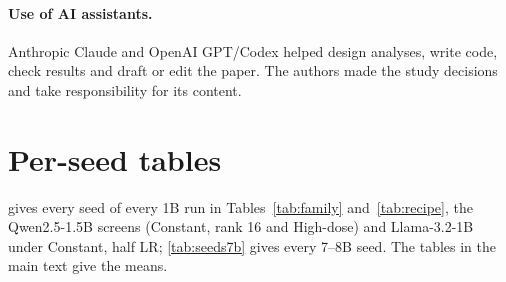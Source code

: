 \documentclass[11pt]{article}
\begin{document}
\paragraph{Use of AI assistants.} Anthropic Claude and OpenAI GPT/Codex helped
design analyses, write code, check results and draft or edit the paper. The
authors made the study decisions and take responsibility for its content.



\appendix
\makeatletter
\setlength{\@fptop}{0pt}
\makeatother

\FloatBarrier
\section{Per-seed tables}
\label{app:seeds}

 gives every seed of every 1B run in
Tables~\ref{tab:family} and~\ref{tab:recipe}, the
Qwen2.5-1.5B screens (Constant, rank 16 and High-dose) and Llama-3.2-1B under
Constant, half LR; \cref{tab:seeds7b} gives every 7--8B seed. The tables in
the main text give the means.
\end{document}
